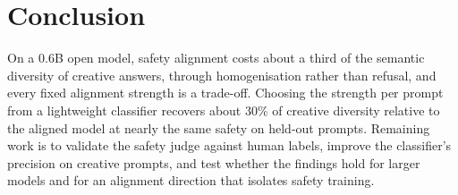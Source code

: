 \documentclass[11pt,a4paper]{article}
\begin{document}
\section{Conclusion}

On a 0.6B open model, safety alignment costs about a third of the semantic diversity of creative answers, through homogenisation rather than refusal, and every fixed alignment strength is a trade-off. Choosing the strength per prompt from a lightweight classifier recovers about 30\% of creative diversity relative to the aligned model at nearly the same safety on held-out prompts. Remaining work is to validate the safety judge against human labels, improve the classifier's precision on creative prompts, and test whether the findings hold for larger models and for an alignment direction that isolates safety training.
\end{document}
